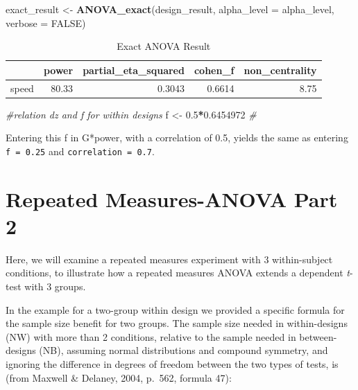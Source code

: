 \documentclass[]{book}
\newenvironment{Shaded}{\begin{snugshade}}{\end{snugshade}}
\newcommand{\CommentTok}[1]{\textcolor[rgb]{0.56,0.35,0.01}{\textit{#1}}}
\newcommand{\DataTypeTok}[1]{\textcolor[rgb]{0.13,0.29,0.53}{#1}}
\newcommand{\FloatTok}[1]{\textcolor[rgb]{0.00,0.00,0.81}{#1}}
\newcommand{\KeywordTok}[1]{\textcolor[rgb]{0.13,0.29,0.53}{\textbf{#1}}}
\newcommand{\NormalTok}[1]{#1}
\newcommand{\OperatorTok}[1]{\textcolor[rgb]{0.81,0.36,0.00}{\textbf{#1}}}
\newcommand{\OtherTok}[1]{\textcolor[rgb]{0.56,0.35,0.01}{#1}}
\newcommand{\StringTok}[1]{\textcolor[rgb]{0.31,0.60,0.02}{#1}}
\begin{document}
\begin{Shaded}
\begin{Highlighting}[]
\NormalTok{exact_result <-}\StringTok{ }\KeywordTok{ANOVA_exact}\NormalTok{(design_result,}
                            \DataTypeTok{alpha_level =}\NormalTok{ alpha_level,}
                            \DataTypeTok{verbose =} \OtherTok{FALSE}\NormalTok{)}
\end{Highlighting}
\end{Shaded}

\begin{table}[t]

\caption{\label{tab:unnamed-chunk-103}Exact ANOVA Result}
\centering
\begin{tabular}{l|r|r|r|r}
\hline
  & power & partial\_eta\_squared & cohen\_f & non\_centrality\\
\hline
speed & 80.33 & 0.3043 & 0.6614 & 8.75\\
\hline
\end{tabular}
\end{table}

\begin{Shaded}
\begin{Highlighting}[]
\CommentTok{#relation dz and f for within designs }
\NormalTok{f <-}\StringTok{ }\FloatTok{0.5}\OperatorTok{*}\FloatTok{0.6454972}
\CommentTok{#  }
\end{Highlighting}
\end{Shaded}

Entering this f in G*power, with a correlation of 0.5, yields the same as entering \texttt{f\ =\ 0.25} and \texttt{correlation\ =\ 0.7}.

\hypertarget{repeated-measures-anova-part-2}{%
\section{Repeated Measures-ANOVA Part 2}\label{repeated-measures-anova-part-2}}

Here, we will examine a repeated measures experiment with 3 within-subject conditions, to illustrate how a repeated measures ANOVA extends a dependent \emph{t}-test with 3 groups.

In the example for a two-group within design we provided a specific formula for the sample size benefit for two groups. The sample size needed in within-designs (NW) with more than 2 conditions, relative to the sample needed in between-designs (NB), assuming normal distributions and compound symmetry, and ignoring the difference in degrees of freedom between the two types of tests, is (from Maxwell \& Delaney, 2004, p.~562, formula 47):
\end{document}
